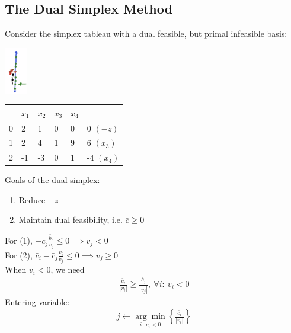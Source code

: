 \documentclass[11pt]{article}
\numberwithin{equation}{section}
\begin{document}
\subsection{The Dual Simplex Method}
Consider the simplex tableau with a dual feasible, but primal infeasible basis:

\begin{minipage}[b]{0.3\linewidth}
    \centering
    \includegraphics[width = 1cm]{images/7-ex-1.png}
\end{minipage}
\begin{minipage}[b]{0.65\linewidth}
    \begin{table}[H]
        \centering
        \begin{tabular}{l|llll|l}
         & $x_1$ & $x_2$ & $x_3$ & $x_4$ &    \\ \hline
        0 & 2     & 1     & 0     & 0     & 0 $\left( -z \right)$  \\ \hline
        1 & 2     & 4     & 1     & 9     & 6 $\left( x_3 \right)$ \\
        2 & -1    & -3    & 0     & 1     & -4 $\left( x_4 \right)$
        \end{tabular}
    \end{table}
\end{minipage}

Goals of the dual simplex: \begin{enumerate}
    \item Reduce $-z$
    \item Maintain dual feasibility, i.e. $\bar{c} \geq 0$
\end{enumerate}

For (1), $-\bar{c}_j \frac{\bar{b}_e}{v_j} \leq 0 \implies v_j < 0$\\
For (2), $\bar{c}_i-\bar{c}_j \frac{v_i}{v_j} \leq 0 \implies v_j \geq 0$\\
When $v_i < 0$, we need \begin{align*}
    \frac{\bar{c}_i}{|v_i|} \geq \frac{\bar{c}_j}{|v_j|}, \ \forall i: \ v_i < 0
\end{align*}
Entering variable: \begin{align*}
    j \leftarrow \underset{i: \ v_i < 0}{\arg \min} \left\{ \frac{\bar{c}_i}{|v_i|} \right\}
\end{align*}
\end{document}
